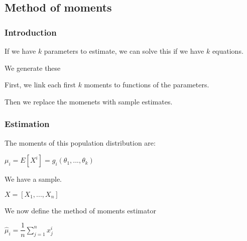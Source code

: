 
\subsection{Method of moments}

\subsubsection{Introduction}

If we have \(k\) parameters to estimate, we can solve this if we have \(k\) equations.

We generate these

First, we link each first \(k\) moments to functions of the parameters.

Then we replace the momenets with sample estimates.

\subsubsection{Estimation}

The moments of this population distribution are:

\(\mu_i =E[X^i]=g_i(\theta_1,...,\theta_k)\)

We have a sample.

\(X=[X_1,...,X_n]\)

We now define the method of moments estimator

\(\hat \mu_i=\dfrac{1}{n}\sum_{j=1}^nx_j^i\)




